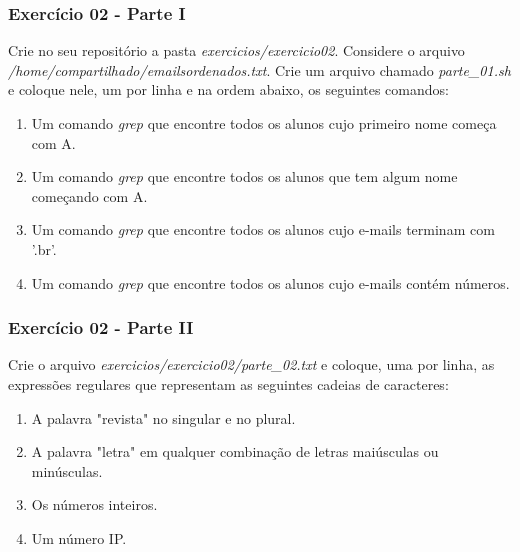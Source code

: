 \documentclass{beamer}
\begin{document}
   \begin{frame}
      \frametitle{Exercício 02 - Parte I}
      Crie no seu repositório a pasta \textit{exercicios/exercicio02}. Considere o arquivo \textit{/home/compartilhado/emailsordenados.txt}. Crie um arquivo chamado \textit{parte\_01.sh} e coloque nele, 
      um por linha e na ordem abaixo, os seguintes comandos:
      \begin{enumerate}
         \item Um comando \textit{grep} que encontre todos os alunos cujo primeiro nome começa com A.
	      \item Um comando \textit{grep} que encontre todos os alunos que tem algum nome começando com A.
	      \item Um comando \textit{grep} que encontre todos os alunos cujo e-mails terminam com '.br'.
	      \item Um comando \textit{grep} que encontre todos os alunos cujo e-mails contém números.
      \end{enumerate}
   \end{frame}

   \begin{frame}
      \frametitle{Exercício 02 - Parte II}
      Crie o arquivo \textit{exercicios/exercicio02/parte\_02.txt} e coloque, uma por linha, as expressões regulares que representam as seguintes cadeias de caracteres:
      \begin{enumerate}
         \item A palavra "revista" no singular e no plural.
	      \item A palavra "letra" em qualquer combinação de letras maiúsculas ou minúsculas.
	      \item Os números inteiros.
	      \item Um número IP.
      \end{enumerate}
   \end{frame}

\end{document}

